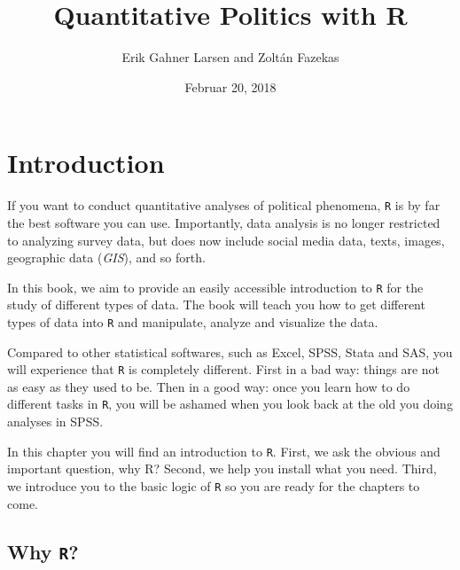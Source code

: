 \documentclass[12pt,oneside]{reedthesis}
\title{\Huge{ Quantitative Politics with R } \vspace{2em}}
\author{Erik Gahner Larsen and Zoltán Fazekas}
\date{Februar 20, 2018}
\theoremstyle{definition}
\theoremstyle{definition}
\theoremstyle{definition}
\theoremstyle{remark}
\begin{document}
      \maketitle
  
  \frontmatter %
  \pagestyle{empty} %

  
  
      \hypersetup{linkcolor=black}
    \setcounter{tocdepth}{2}
    \tableofcontents
  
  
  
  
  
  \mainmatter %
  \pagestyle{fancyplain} %

  \chapter{Introduction}\label{introduction}
  
  If you want to conduct quantitative analyses of political phenomena,
  \texttt{R} is by far the best software you can use. Importantly, data
  analysis is no longer restricted to analyzing survey data, but does now
  include social media data, texts, images, geographic data (\emph{GIS}),
  and so forth.
  
  In this book, we aim to provide an easily accessible introduction to
  \texttt{R} for the study of different types of data. The book will teach
  you how to get different types of data into \texttt{R} and manipulate,
  analyze and visualize the data.
  
  Compared to other statistical softwares, such as Excel, SPSS, Stata and
  SAS, you will experience that \texttt{R} is completely different. First
  in a bad way: things are not as easy as they used to be. Then in a good
  way: once you learn how to do different tasks in \texttt{R}, you will be
  ashamed when you look back at the old you doing analyses in SPSS.
  
  In this chapter you will find an introduction to \texttt{R}. First, we
  ask the obvious and important question, why R? Second, we help you
  install what you need. Third, we introduce you to the basic logic of
  \texttt{R} so you are ready for the chapters to come.
  
  \section{\texorpdfstring{Why \texttt{R}?}{Why R?}}\label{why-r}
  
\end{document}
